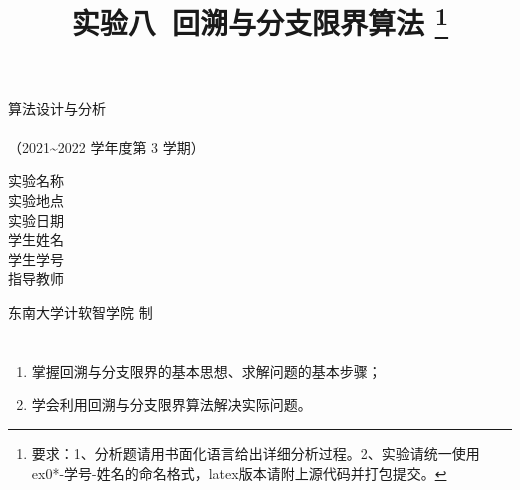 \documentclass[12pt,a4paper]{ctexart}
\begin{document}
    \begin{titlepage}
        \heiti
        \vspace*{64pt}
        \begin{center}
            \fontsize{48pt}{0} 算法设计与分析\\
            \vspace*{36pt}
            \\
            \vspace*{48pt}
            \LARGE（2021\~{}2022 学年度\qquad 第 3 学期）\\
            \vspace*{48pt}
        
            \LARGE 实验名称\ \ \underline{\makebox[200pt]{\ExamTitle}}\\
            \LARGE 实验地点\ \ \underline{\makebox[200pt]{\ExamAddr}}\\
            \LARGE 实验日期\ \ \underline{\makebox[200pt]{\today}}\\
            \LARGE 学生姓名\ \ \underline{\makebox[200pt]{\MyName}}\\
            \LARGE 学生学号\ \ \underline{\makebox[200pt]{\MySID}}\\
            \LARGE 指导教师\ \ \underline{\makebox[200pt]{\TeacherName}}\\
            \vspace*{48pt}
            
            \LARGE 东南大学\quad  计软智学院 \quad 制
        \end{center}
    \end{titlepage}

\title{
  {\heiti \textbf{实验八\ 回溯与分支限界算法}
    \footnote{要求：1、分析题请用书面化语言给出详细分析过程。2、实验请统一使用ex0*-学号-姓名的命名格式，latex版本请附上源代码并打包提交。}
    }
}
\date{}

\maketitle

\section*{\bf \color{black}{一、实验目的及意义}}
\noindent
\begin{enumerate}
	\item[(1)]  掌握回溯与分支限界的基本思想、求解问题的基本步骤；
	\item[(2)]  学会利用回溯与分支限界算法解决实际问题。
\end{enumerate}
\end{document}
